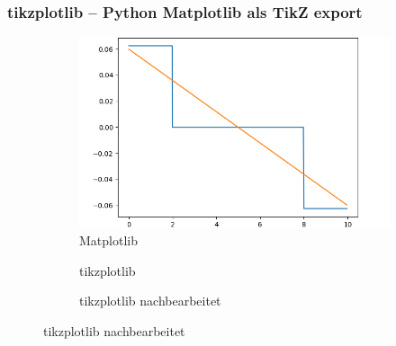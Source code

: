\documentclass{beamer}
\begin{document}
\begin{frame}[fragile]
    \frametitle{tikzplotlib -- Python Matplotlib als TikZ export}%
    \vspace*{-1ex}
    \begin{figure}
        \begin{subfigure}{0.5\textwidth}
            \centering
        \end{subfigure}%
        \begin{subfigure}{0.5\textwidth}
            \centering
            \includegraphics[width=.8\linewidth]{images/tikzplotlib/tpl-example-crop}
            \caption{Matplotlib}
        \end{subfigure}%

        \begin{subfigure}{0.5\textwidth}
            
            \caption{tikzplotlib}
        \end{subfigure}%
        \begin{subfigure}{0.5\textwidth}
            \raisebox{0.65ex}{}
            \caption{tikzplotlib nachbearbeitet}
        \end{subfigure}%
    \end{figure}
\end{frame}
\end{document}
